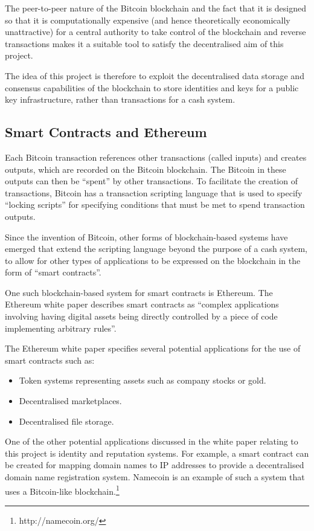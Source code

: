 \documentclass[12pt]{report}
\begin{document}
	The peer-to-peer nature of the Bitcoin blockchain and the fact that it is designed so that it is computationally expensive (and hence theoretically economically unattractive) for a central authority to take control of the blockchain and reverse transactions makes it a suitable tool to satisfy the decentralised aim of this project.
	
	The idea of this project is therefore to exploit the decentralised data storage and consensus capabilities of the blockchain to store identities and keys for a public key infrastructure, rather than transactions for a cash system.
	
	\subsection{Smart Contracts and Ethereum}
	Each Bitcoin transaction references other transactions (called inputs) and creates outputs, which are recorded on the Bitcoin blockchain. The Bitcoin in these outputs can then be ``spent'' by other transactions. To facilitate the creation of transactions, Bitcoin has a transaction scripting language that is used to specify ``locking scripts'' for specifying conditions that must be met to spend transaction outputs.\cite{10}
	
	Since the invention of Bitcoin, other forms of blockchain-based systems have emerged that extend the scripting language beyond the purpose of a cash system, to allow for other types of applications to be expressed on the blockchain in the form of ``smart contracts''. 
	
	One such blockchain-based system for smart contracts is Ethereum. The Ethereum white paper describes smart contracts as ``complex applications involving having digital assets being directly controlled by a piece of code implementing arbitrary rules''.\cite{3}
	
	The Ethereum white paper specifies several potential applications for the use of smart contracts such as:
	\begin{itemize}
		\item Token systems representing assets such as company stocks or gold.
		\item Decentralised marketplaces.
		\item Decentralised file storage.
	\end{itemize}
	
	One of the other potential applications discussed in the white paper relating to this project is identity and reputation systems. For example, a smart contract can be created for mapping domain names to IP addresses to provide a decentralised domain name registration system. Namecoin is an example of such a system that uses a Bitcoin-like blockchain.\footnote{http://namecoin.org/}
	
\end{document}
